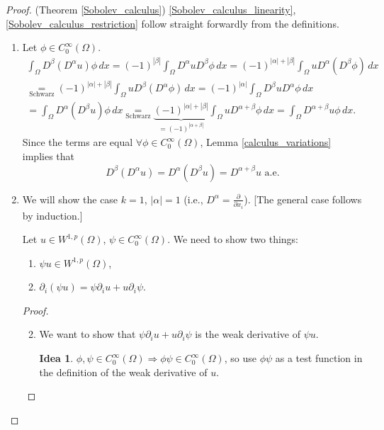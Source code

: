 \documentclass[12pt]{article}
\theoremstyle{definition}
\newtheorem*{idea}{Idea}
\begin{document}
\begin{proof}
(Theorem \ref{Sobolev_calculus}) \ref{Sobolev_calculus_linearity}, \ref{Sobolev_calculus_restriction} follow straight forwardly from the definitions.
\begin{enumerate}[label=(\roman*)]
\item Let $\phi\in C_0^{\infty}(\Omega)$.
\begin{multline*}
\int_{\Omega}D^{\beta}(D^{\alpha}u)\phi\,dx=(-1)^{|\beta|}\int_{\Omega}D^{\alpha}uD^{\beta}\phi\,dx=(-1)^{|\alpha|+|\beta|}\int_{\Omega}uD^{\alpha}(D^{\beta}\phi)\,dx\\
\underset{\text{Schwarz}}{=}(-1)^{|\alpha|+|\beta|}\int_{\Omega}uD^{\beta}(D^{\alpha}\phi)\,dx=(-1)^{|\alpha|}\int_{\Omega}D^{\beta}uD^{\alpha}\phi\,dx\\
=\int_{\Omega}D^{\alpha}(D^{\beta}u)\phi\,dx\underset{\text{Schwarz}}{=}\underbrace{(-1)^{|\alpha|+|\beta|}}_{=(-1)^{|\alpha+\beta|}}\int_{\Omega}uD^{\alpha+\beta}\phi\,dx=\int_{\Omega}D^{\alpha+\beta}u\phi\,dx.
\end{multline*}
Since the terms are equal $\forall\phi\in C_0^{\infty}(\Omega)$, Lemma \ref{calculus_variations} implies that
\[D^{\beta}(D^{\alpha}u)=D^{\alpha}(D^{\beta}u)=D^{\alpha+\beta}u\text{ a.e.}\]

\item We will show the case $k=1$, $|\alpha|=1$ (i.e., $D^{\alpha}=\frac{\partial}{\partial x_i}$). [The general case follows by induction.]

Let $u\in W^{1,p}(\Omega)$, $\psi\in C_0^{\infty}(\Omega)$. We need to show two things:
\begin{enumerate}[label=(\alph*)]
\item $\psi u\in W^{1,p}(\Omega)$,
\item $\partial_i(\psi u)=\psi\partial_iu+u\partial_i\psi$.
\end{enumerate}
\begin{proof}
\begin{enumerate}[label=(\alph*)]
\setcounter{enumii}{1}
\item We want to show that $\psi\partial_iu+u\partial_i\psi$ is the weak derivative of $\psi u$.

\begin{idea}
$\phi,\psi\in C_0^{\infty}(\Omega)\Rightarrow\phi\psi\in C_0^{\infty}(\Omega)$, so use $\phi\psi$ as a test function in the definition of the weak derivative of $u$.
\end{idea}


\end{enumerate}
\end{proof}
\end{enumerate}
\end{proof}
\end{document}

